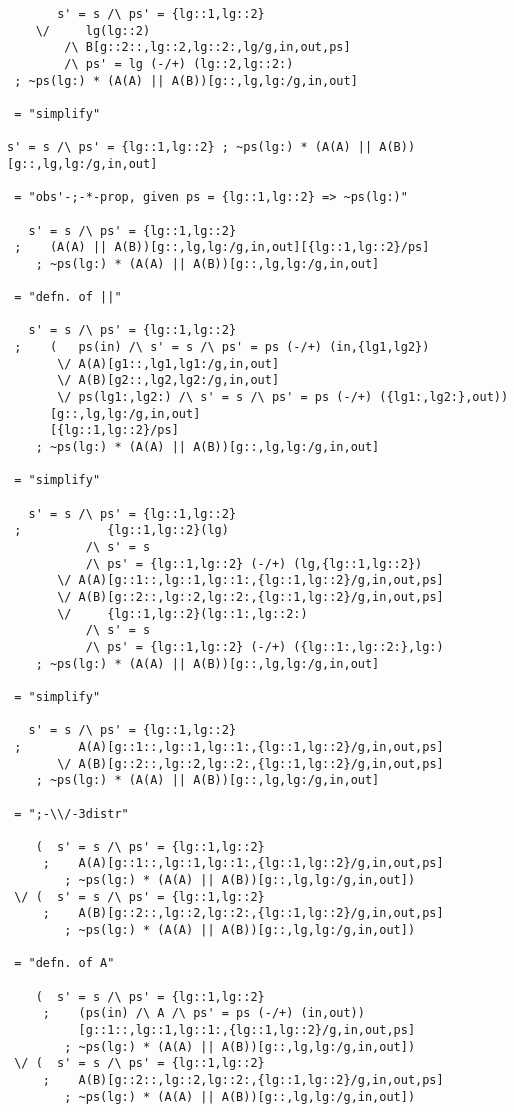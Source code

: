 \begin{verbatim}
       s' = s /\ ps' = {lg::1,lg::2}
    \/     lg(lg::2)
        /\ B[g::2::,lg::2,lg::2:,lg/g,in,out,ps]
        /\ ps' = lg (-/+) (lg::2,lg::2:)
 ; ~ps(lg:) * (A(A) || A(B))[g::,lg,lg:/g,in,out]

 = "simplify"

s' = s /\ ps' = {lg::1,lg::2} ; ~ps(lg:) * (A(A) || A(B))[g::,lg,lg:/g,in,out]

 = "obs'-;-*-prop, given ps = {lg::1,lg::2} => ~ps(lg:)"

   s' = s /\ ps' = {lg::1,lg::2}
 ;    (A(A) || A(B))[g::,lg,lg:/g,in,out][{lg::1,lg::2}/ps]
    ; ~ps(lg:) * (A(A) || A(B))[g::,lg,lg:/g,in,out]

 = "defn. of ||"

   s' = s /\ ps' = {lg::1,lg::2}
 ;    (   ps(in) /\ s' = s /\ ps' = ps (-/+) (in,{lg1,lg2})
       \/ A(A)[g1::,lg1,lg1:/g,in,out]
       \/ A(B)[g2::,lg2,lg2:/g,in,out]
       \/ ps(lg1:,lg2:) /\ s' = s /\ ps' = ps (-/+) ({lg1:,lg2:},out))
      [g::,lg,lg:/g,in,out]
      [{lg::1,lg::2}/ps]
    ; ~ps(lg:) * (A(A) || A(B))[g::,lg,lg:/g,in,out]

 = "simplify"

   s' = s /\ ps' = {lg::1,lg::2}
 ;            {lg::1,lg::2}(lg)
           /\ s' = s
           /\ ps' = {lg::1,lg::2} (-/+) (lg,{lg::1,lg::2})
       \/ A(A)[g::1::,lg::1,lg::1:,{lg::1,lg::2}/g,in,out,ps]
       \/ A(B)[g::2::,lg::2,lg::2:,{lg::1,lg::2}/g,in,out,ps]
       \/     {lg::1,lg::2}(lg::1:,lg::2:)
           /\ s' = s
           /\ ps' = {lg::1,lg::2} (-/+) ({lg::1:,lg::2:},lg:)
    ; ~ps(lg:) * (A(A) || A(B))[g::,lg,lg:/g,in,out]

 = "simplify"

   s' = s /\ ps' = {lg::1,lg::2}
 ;        A(A)[g::1::,lg::1,lg::1:,{lg::1,lg::2}/g,in,out,ps]
       \/ A(B)[g::2::,lg::2,lg::2:,{lg::1,lg::2}/g,in,out,ps]
    ; ~ps(lg:) * (A(A) || A(B))[g::,lg,lg:/g,in,out]

 = ";-\\/-3distr"

    (  s' = s /\ ps' = {lg::1,lg::2}
     ;    A(A)[g::1::,lg::1,lg::1:,{lg::1,lg::2}/g,in,out,ps]
        ; ~ps(lg:) * (A(A) || A(B))[g::,lg,lg:/g,in,out])
 \/ (  s' = s /\ ps' = {lg::1,lg::2}
     ;    A(B)[g::2::,lg::2,lg::2:,{lg::1,lg::2}/g,in,out,ps]
        ; ~ps(lg:) * (A(A) || A(B))[g::,lg,lg:/g,in,out])

 = "defn. of A"

    (  s' = s /\ ps' = {lg::1,lg::2}
     ;    (ps(in) /\ A /\ ps' = ps (-/+) (in,out))
          [g::1::,lg::1,lg::1:,{lg::1,lg::2}/g,in,out,ps]
        ; ~ps(lg:) * (A(A) || A(B))[g::,lg,lg:/g,in,out])
 \/ (  s' = s /\ ps' = {lg::1,lg::2}
     ;    A(B)[g::2::,lg::2,lg::2:,{lg::1,lg::2}/g,in,out,ps]
        ; ~ps(lg:) * (A(A) || A(B))[g::,lg,lg:/g,in,out])


\end{verbatim}
